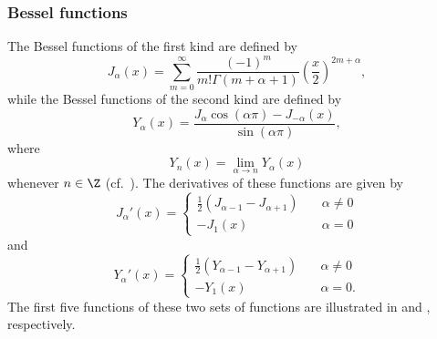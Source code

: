 \subsubsection{Bessel functions}
The Bessel functions of the first kind are defined by
\begin{equation*}
	J_\alpha(x) = \sum_{m=0}^\infty \frac{(-1)^m}{m! \Gamma(m+\alpha+1)}\left(\frac{x}{2}\right)^{2m+\alpha},
\end{equation*}
while the Bessel functions of the second kind are defined by
\begin{equation*}
	Y_\alpha(x) = \frac{J_\alpha \cos(\alpha\pi)-J_{-\alpha}(x)}{\sin(\alpha\pi)},
\end{equation*}
where
\begin{equation*}
	Y_n(x) = \lim_{\alpha\to n} Y_\alpha(x)
\end{equation*}
whenever $n\in\Z$ (cf.~\cite[p. 358]{Abramovitz1964ham}). The derivatives of these functions are given by
\begin{equation*}
	J_\alpha'(x) = \begin{cases}
		\frac{1}{2}\left(J_{\alpha-1}-J_{\alpha+1}\right)\quad&\alpha\neq 0\\
		-J_1(x) \quad &\alpha=0
	\end{cases}
\end{equation*}
and
\begin{equation*}
	Y_\alpha'(x) = \begin{cases}
		\frac{1}{2}\left(Y_{\alpha-1}-Y_{\alpha+1}\right)\quad&\alpha\neq 0\\
		-Y_1(x) \quad &\alpha=0.
	\end{cases}
\end{equation*}
The first five functions of these two sets of functions are illustrated in  and , respectively.
